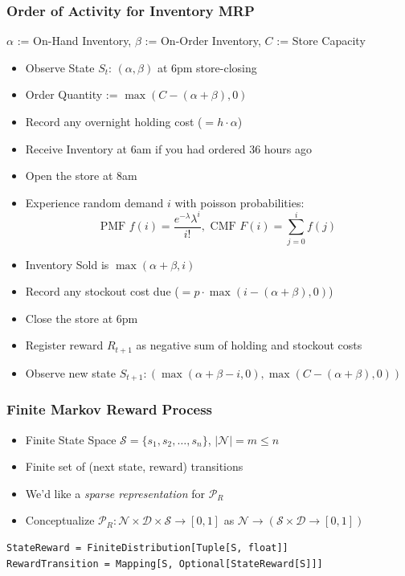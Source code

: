 \documentclass[handout]{beamer}
\begin{document}
\begin{frame}
\frametitle{Order of Activity for Inventory MRP}
\pause
$\alpha$ := On-Hand Inventory, $\beta$ := On-Order Inventory, $C$ := Store Capacity
\pause
\begin{itemize}[<+->]
\item Observe State $S_t$: $(\alpha, \beta)$ at 6pm store-closing
\item Order Quantity := $\max(C - (\alpha + \beta), 0)$
\item Record any overnight holding cost ($=h \cdot \alpha$)
\item Receive Inventory at 6am if you had ordered 36 hours ago
\item Open the store at 8am
\item Experience random demand $i$ with poisson probabilities:
$$\text{PMF } f(i) = \frac {e^{-\lambda} \lambda^i} {i!}, \text{ CMF } F(i) = \sum_{j=0}^i f(j)$$
\item Inventory Sold is $\max(\alpha + \beta, i)$
\item Record any stockout cost due ($=p\cdot \max(i - (\alpha + \beta), 0)$)
\item Close the store at 6pm
\item Register reward $R_{t+1}$ as negative sum of holding and stockout costs
\item Observe new state $S_{t+1}: (\max(\alpha + \beta - i, 0), \max(C - (\alpha + \beta), 0))$
\end{itemize}
\end{frame}

\begin{frame}[fragile]
\frametitle{Finite Markov Reward Process}
\pause
\begin{itemize}[<+->]
\item Finite State Space $\mathcal{S} = \{s_1, s_2, \ldots, s_n\}$, $|\mathcal{N}| = m\leq n$
\item Finite set of (next state, reward) transitions
\item We'd like a {\em sparse representation} for $\mathcal{P}_R$
\item Conceptualize $\mathcal{P}_R : \mathcal{N} \times \mathcal{D} \times \mathcal{S} \rightarrow [0, 1]$ as $\mathcal{N} \rightarrow (\mathcal{S} \times \mathcal{D} \rightarrow [0, 1])$
\end{itemize}
\pause
\begin{lstlisting}
StateReward = FiniteDistribution[Tuple[S, float]]
RewardTransition = Mapping[S, Optional[StateReward[S]]]
\end{lstlisting}
\end{frame}
\end{document}
